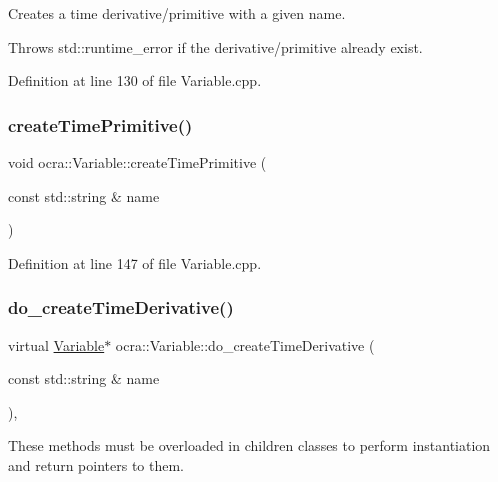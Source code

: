 Creates a time derivative/primitive with a given name. 

Throws std\+::runtime\+\_\+error if the derivative/primitive already exist. 

Definition at line 130 of file Variable.\+cpp.

\hypertarget{classocra_1_1Variable_ac21275c0369ff7412d44bbb8ca5b9c7b}{}\label{classocra_1_1Variable_ac21275c0369ff7412d44bbb8ca5b9c7b} 
\subsubsection{\texorpdfstring{create\+Time\+Primitive()}{createTimePrimitive()}}
{\footnotesize\ttfamily void ocra\+::\+Variable\+::create\+Time\+Primitive (\begin{DoxyParamCaption}\item[{const std\+::string \&}]{name }\end{DoxyParamCaption})}



Definition at line 147 of file Variable.\+cpp.

\hypertarget{classocra_1_1Variable_aaed3c9bb3258cc1120ae8f93722a12bb}{}\label{classocra_1_1Variable_aaed3c9bb3258cc1120ae8f93722a12bb} 
\subsubsection{\texorpdfstring{do\+\_\+create\+Time\+Derivative()}{do\_createTimeDerivative()}}
{\footnotesize\ttfamily virtual \hyperlink{classocra_1_1Variable}{Variable}$\ast$ ocra\+::\+Variable\+::do\+\_\+create\+Time\+Derivative (\begin{DoxyParamCaption}\item[{const std\+::string \&}]{name }\end{DoxyParamCaption})\hspace{0.3cm}{\ttfamily [protected]}, {}}



These methods must be overloaded in children classes to perform instantiation and return pointers to them. 

